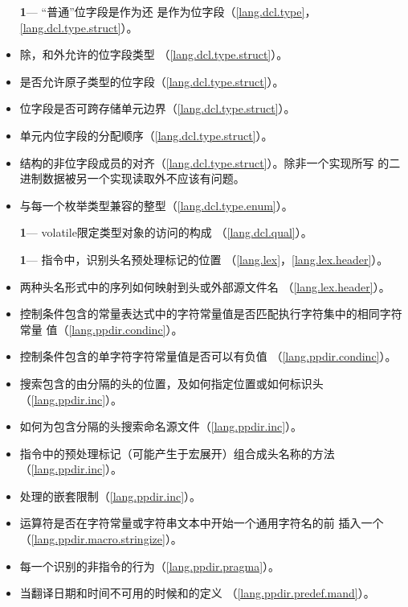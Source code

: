 \begin{itemize} %
  \item[\textbf{1}\hspace{5pt}---]{``普通''位字段是作为还
    是作为位字段（\ref{lang.dcl.type}，
    \ref{lang.dcl.type.struct}）。}
  \item{除，和外允许的位字段类型
    （\ref{lang.dcl.type.struct}）。}
  \item{是否允许原子类型的位字段（\ref{lang.dcl.type.struct}）。}
  \item{位字段是否可跨存储单元边界（\ref{lang.dcl.type.struct}）。}
  \item{单元内位字段的分配顺序（\ref{lang.dcl.type.struct}）。}
  \item{结构的非位字段成员的对齐（\ref{lang.dcl.type.struct}）。除非一个实现所写
    的二进制数据被另一个实现读取外不应该有问题。}
  \item{与每一个枚举类型兼容的整型（\ref{lang.dcl.type.enum}）。}
\end{itemize}

\begin{itemize}
  \item[\textbf{1}\hspace{5pt}---]{volatile限定类型对象的访问的构成
    （\ref{lang.dcl.qual}）。}
\end{itemize}

\begin{itemize} %
  \item[\textbf{1}\hspace{5pt}---]{指令中，识别头名预处理标记的位置
    （\ref{lang.lex}，\ref{lang.lex.header}）。}
  \item{两种头名形式中的序列如何映射到头或外部源文件名
    （\ref{lang.lex.header}）。}
  \item{控制条件包含的常量表达式中的字符常量值是否匹配执行字符集中的相同字符常量
    值（\ref{lang.ppdir.condinc}）。}
  \item{控制条件包含的单字符字符常量值是否可以有负值
    （\ref{lang.ppdir.condinc}）。}
  \item{搜索包含的由\tm{< >}分隔的头的位置，及如何指定位置或如何标识头
    （\ref{lang.ppdir.inc}）。}
  \item{如何为包含\tm{\dq \dq}分隔的头搜索命名源文件（\ref{lang.ppdir.inc}）。}
  \item{指令中的预处理标记（可能产生于宏展开）组合成头名称的方法
    （\ref{lang.ppdir.inc}）。}
  \item{处理的嵌套限制（\ref{lang.ppdir.inc}）。}
  \item{\tm{\#}运算符是否在字符常量或字符串文本中开始一个通用字符名的\tm{\bs}前
    插入一个\tm{\bs}（\ref{lang.ppdir.macro.stringize}）。}
  \item{每一个识别的非指令的行为（\ref{lang.ppdir.pragma}）。}
  \item{当翻译日期和时间不可用的时候和的定义
    （\ref{lang.ppdir.predef.mand}）。}
\end{itemize}

